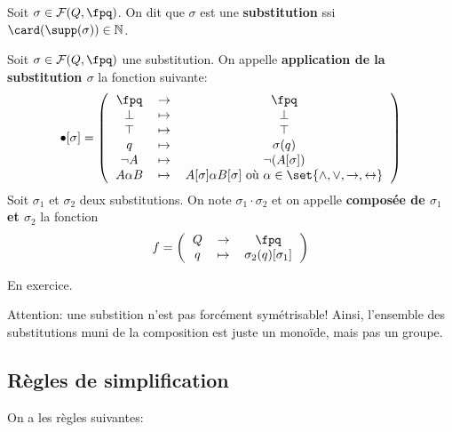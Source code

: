 \documentclass{scrartcl}
\begin{document}
			 Soit $\sigma \in \mathcal{F}(Q,\fpq)$. On dit que $\sigma$ est une \textbf{substitution} ssi $\card(\supp(\sigma)) \in \mathbb{N}$.

			 Soit $\sigma \in \mathcal{F}(Q,\fpq)$ une substitution. 
			On appelle \textbf{application de la substitution $\sigma$} la fonction suivante:
			\[
				\bullet[\sigma] = 
				\left(\begin{tabular}{c c c}
					$\fpq$ & $\rightarrow$ & $\fpq$ \\
					$\bot$ & $\mapsto$ & $\bot$ \\
					$\top$ & $\mapsto$ & $\top$ \\
					$q$ & $\mapsto$ & $\sigma(q)$ \\
					$\neg A$ & $\mapsto$ & $\neg (A[\sigma])$ \\
					$A \alpha B$ & $\mapsto$ & $A[\sigma] \alpha B[\sigma]$ où $\alpha \in \set{\wedge,\vee,\rightarrow,\leftrightarrow}$
				\end{tabular}\right)
			\]
			Soit $\sigma_1$ et $\sigma_2$ deux substitutions. 
			On note $\sigma_1\cdot\sigma_2$ et on appelle \textbf{composée de $\sigma_1$ et $\sigma_2$} la fonction
			\[f=\left(\begin{tabular}{c c c }
			$Q$ & $\rightarrow$ & $\fpq$ \\
			$q$ & $\mapsto$ & $\sigma_2(q)[\sigma_1]$
			\end{tabular}\right)\]

			\begin{demo}
				\item En exercice.
			\end{demo}
			
			\rem Attention: une substition n'est pas forcément symétrisable! 
			Ainsi, l'ensemble des substitutions muni de la composition est juste un monoïde, mais pas un groupe. 

		\subsection{Règles de simplification}
			On a les règles suivantes:
			
\end{document}
